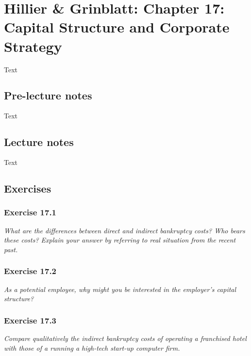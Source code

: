 \documentclass[]{book}
\theoremstyle{definition}
\theoremstyle{definition}
\theoremstyle{remark}
\begin{document}
\chapter{Hillier \& Grinblatt: Chapter 17: Capital Structure and
Corporate
Strategy}\label{hillier-grinblatt-chapter-17-capital-structure-and-corporate-strategy}

Text

\section{Pre-lecture notes}\label{pre-lecture-notes-17}

Text

\section{Lecture notes}\label{lecture-notes-17}

Text

\section{Exercises}\label{exercises-17}

\subsection{Exercise 17.1}\label{exercise-17.1}

\emph{What are the differences between direct and indirect bankruptcy
costs? Who bears these costs? Explain your answer by referring to real
situation from the recent past.} \citep[p.575]{book}

\subsection{Exercise 17.2}\label{exercise-17.2}

\emph{As a potential employee, why might you be interested in the
employer's capital structure?} \citep[p.575]{book}

\subsection{Exercise 17.3}\label{exercise-17.3}

\emph{Compare qualitatively the indirect bankruptcy costs of operating a
franchised hotel with those of a running a high-tech start-up computer
firm.} \citep[p.575]{book}
\end{document}
